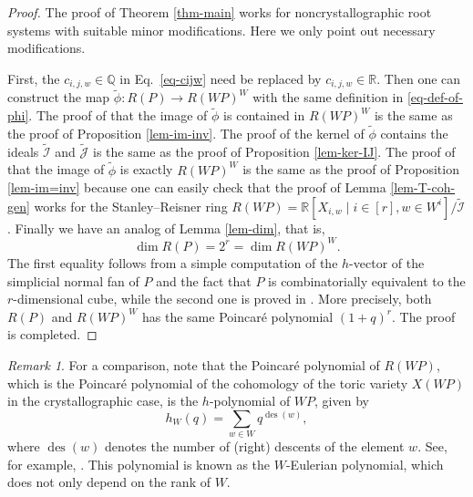 \documentclass{amsart}
\theoremstyle{definition}
\theoremstyle{remark}
\newtheorem{remark}[theorem]{Remark}
\numberwithin{equation}{section}
\begin{document}
\begin{proof}
    The proof of Theorem \ref{thm-main} works for noncrystallographic root systems with suitable minor modifications. Here we only point out necessary modifications. 
    
    First, the $c_{i,j,w} \in \mathbb{Q}$ in Eq.~\eqref{eq-cijw} need be replaced by $c_{i,j,w} \in \mathbb{R}$. Then one can construct the map $\widetilde{\phi}: R\left(P\right) \longrightarrow R\left(\mathit{WP}\right)^W$ with the same definition in \eqref{eq-def-of-phi}. The proof of that the image of $\widetilde{\phi}$ is contained in $R\left(\mathit{WP}\right)^W$ is the same as the proof of Proposition \ref{lem-im-inv}. The proof of the kernel of $\widetilde{\phi}$ contains the ideals $\widetilde{\mathcal{I}}$ and $\widetilde{\mathcal{J}}$ is the same as the proof of Proposition \ref{lem-ker-IJ}. The proof of that the image of $\widetilde{\phi}$ is exactly $R\left(\mathit{WP}\right)^W$ is the same as the proof of Proposition \ref{lem-im=inv} because one can easily check that the proof of Lemma \ref{lem-T-coh-gen} works for the Stanley--Reisner ring $R\left(\mathit{WP}\right)=\mathbb{R}\left[X_{i,w} \mid i \in [r], w \in W^i\right] / \widetilde{\mathcal{I}}$. Finally we have an analog of Lemma \ref{lem-dim}, that is, 
     $$\dim R\left(P\right) = 2^r =\dim R\left(\mathit{WP}\right)^W.$$
     The first equality follows from a simple computation of the $h$-vector of the simplicial normal fan of $P$ and the fact that $P$ is combinatorially equivalent to the $r$-dimensional cube, while the second one is proved in \cite[p.\ 258]{stembridge1994some}. More precisely, both    $R\left(P\right)$ and  $R\left(\mathit{WP}\right)^W$ has the same Poincar\'e polynomial $(1+q)^r$. The proof is completed. 
\end{proof} 

\begin{remark}
    For a comparison, note that the Poincar\'e polynomial of $R\left(\mathit{WP}\right)$, which is the Poincar\'e polynomial of the cohomology of the toric variety $X(\mathit{WP})$ in the crystallographic case, is the $h$-polynomial of $\mathit{WP}$,
    given by
$$
h_W(q)=\sum_{w \in W} q^{\operatorname{des}(w)},
$$
where $\operatorname{des}(w)$ denotes the number of (right) descents of the element $w$. See, for example, \cite{zbMATH03869390}. This polynomial is known as the $W$-Eulerian polynomial, which does not only depend on the rank of $W$.

\end{remark}



\end{document}
